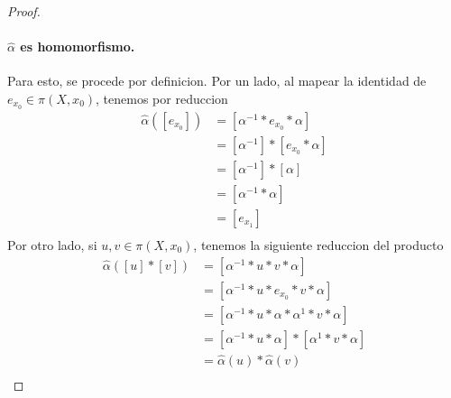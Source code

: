{\begin{proof}
  \paragraph{\(\hat \alpha\) es homomorfismo.} Para esto, se procede por
  definicion. Por un lado, al mapear la identidad de \(e_{x_0} \in \pi
  (X, x_0) \), tenemos por reduccion
  \begin{align*}
    \hat \alpha ([e_{x_0}])
                 &= [\alpha^{-1} * e_{x_0} * \alpha] \\
                 &= [\alpha^{-1}] * [e_{x_0} * \alpha] \\
                 &= [\alpha^{-1}] * [\alpha] \\
                 &= [\alpha^{-1} * \alpha] \\
                 &= [e_{x_1}] \\
  \end{align*}
  Por otro lado, si \(u,v \in \pi (X, x_0) \), tenemos la siguiente
  reduccion del producto
  \begin{align*}
    \hat \alpha ([u] * [v]) &= [\alpha^{-1} * u * v * \alpha] \\
    &= [\alpha^{-1} * u * e_{x_0} * v * \alpha] \\
    &= [\alpha^{-1} * u * \alpha * \alpha^{1} * v * \alpha] \\
    &= [\alpha^{-1} * u * \alpha ] * [ \alpha^{1} * v * \alpha] \\
    &= \hat \alpha (u) * \hat \alpha (v) \\
  \end{align*}


\end{proof}}
